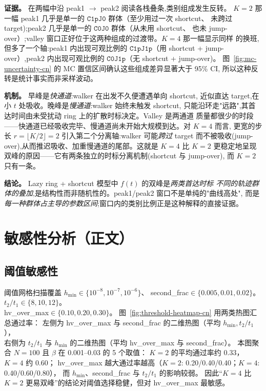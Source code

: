 \documentclass[11pt,fontset=fandol]{ctexart}
\begin{document}
\textbf{证据。} 在两幅中沿 peak1 $\to$ peak2 阅读各栈叠条,类别组成发生反转。
$K=2$ 那一幅 peak1 几乎是单一的 $\texttt{C1pJ0}$ 群体（至少用过一次 shortcut、
未跨过 target);peak2 几乎是单一的 $\texttt{C0J0}$ 群体（从未用 shortcut、
也未 jump-over）;valley 窗口正好位于这两种组成的过渡带。$K=4$ 那一幅显示同样
的换班,但多了一个轴:peak1 内出现可观比例的 $\texttt{C1pJ1p}$（用 shortcut +
jump-over）,peak2 内出现可观比例的 $\texttt{C0J1p}$（无 shortcut + jump-over)。
图~\ref{fig:mc-uncertainty-cn} 的 MC 置信区间确认这些组成差异显著大于 95\% CI,
所以这种反转是统计事实而非采样波动。

\textbf{机制。} 早峰是\emph{快通道}:walker 在出发不久便遭遇单向 shortcut,
近似直达 target,在小 $t$ 处吸收。晚峰是\emph{慢通道}:walker 始终未触发 shortcut,
只能沿环走"远路",其首达时间由未受扰动 ring 上的扩散时标决定。Valley 是两通道
质量都很少的时段——快通道已经吸收完毕、慢通道尚未开始大规模到达。对 $K=4$ 而言,
更宽的步长 $r=\lfloor K/2\rfloor=2$ 引入第二个分离轴:walker 可能\emph{跨过} target
而不被吸收(jump-over),从而推迟吸收、加重慢通道的尾部。这就是 $K=4$ 比 $K=2$
更稳定地呈现双峰的原因——它有两条独立的时标分离机制(shortcut 与 jump-over),
而 $K=2$ 只有一条。

\textbf{结论。} Lazy ring + shortcut 模型中 $f(t)$ 的双峰是\emph{两类首达时标
不同的轨迹群体的叠加},是结构性而非随机性的。peak1/peak2 窗口不是单纯的"曲线高处",
而是\emph{每一种群体占主导的参数区间};窗口内的类别比例正是这种解释的直接证据。

\section{敏感性分析（正文）}
\subsection{阈值敏感性}
阈值网格扫描覆盖 $h_{\min}\in\{10^{-8},10^{-7},10^{-6}\}$、
second\_frac$\in\{0.005,0.01,0.02\}$。
$t_2/t_1\in\{8,10,12\}$。\\
hv\_over\_max$\in\{0.10,0.20,0.30\}$。
图~\ref{fig:threshold-heatmap-cn} 用两类热图汇总通过率：
左侧为 hv\_over\_max 与 second\_frac 的二维热图（平均 $h_{\min},t_2/t_1$），\\
右侧为 $t_2/t_1$ 与 $h_{\min}$ 的二维热图（平均 hv\_over\_max 与 second\_frac）。
本图聚合 $N=100$ 且 $\beta$ 在 0.001--0.03 的 5 个取值：
$K=2$ 的平均通过率约 $0.33$，$K=4$ 约 $0.60$；
hv\_over\_max 越大通过率越高（$K=2$: 0.20/0.40/0.40；$K=4$: 0.40/0.60/0.80），
而 $h_{\min}$、second\_frac 与 $t_2/t_1$ 的影响较弱。
因此“$K=4$ 比 $K=2$ 更易双峰”的结论对阈值选择稳健，但对 hv\_over\_max 最敏感。
\end{document}
